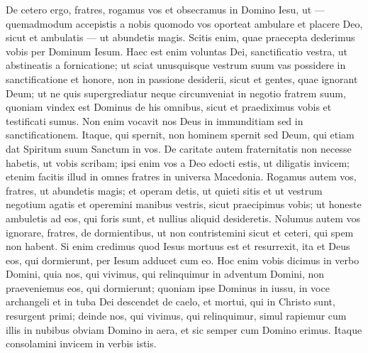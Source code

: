 \begin{biblechapter}
\begin{biblechapter}
\begin{biblechapter}
\begin{biblechapter}
\verse De cetero ergo, fratres, rogamus vos et obsecramus in Domino Iesu, ut — quemadmodum accepistis a nobis quomodo vos oporteat ambulare et placere Deo, sicut et ambulatis — ut abundetis magis. 
\verse Scitis enim, quae praecepta dederimus vobis per Dominum Iesum. 
\verse Haec est enim voluntas Dei, sanctificatio vestra, 
\verse ut abstineatis a fornicatione; ut sciat unusquisque vestrum suum vas possidere in sanctificatione et honore, 
\verse non in passione desiderii, sicut et gentes, quae ignorant Deum; 
\verse ut ne quis supergrediatur neque circumveniat in negotio fratrem suum, quoniam vindex est Dominus de his omnibus, sicut et praediximus vobis et testificati sumus. 
\verse Non enim vocavit nos Deus in immunditiam sed in sanctificationem.
 \verse Itaque, qui spernit, non hominem spernit sed Deum, qui etiam dat Spiritum suum Sanctum in vos.
 \verse De caritate autem fraternitatis non necesse habetis, ut vobis scribam; ipsi enim vos a Deo edocti estis, ut diligatis invicem; 
\verse etenim facitis illud in omnes fratres in universa Macedonia. Rogamus autem vos, fratres, ut abundetis magis; 
\verse et operam detis, ut quieti sitis et ut vestrum negotium agatis et operemini manibus vestris, sicut praecipimus vobis; 
\verse ut honeste ambuletis ad eos, qui foris sunt, et nullius aliquid desideretis.
 \verse Nolumus autem vos ignorare, fratres, de dormientibus, ut non contristemini sicut et ceteri, qui spem non habent. 
\verse Si enim credimus quod Iesus mortuus est et resurrexit, ita et Deus eos, qui dormierunt, per Iesum adducet cum eo. 
 \verse Hoc enim vobis dicimus in verbo Domini, quia nos, qui vivimus, qui relinquimur in adventum Domini, non praeveniemus eos, qui dormierunt; 
\verse quoniam ipse Dominus in iussu, in voce archangeli et in tuba Dei descendet de caelo, et mortui, qui in Christo sunt, resurgent primi; 
\verse deinde nos, qui vivimus, qui relinquimur, simul rapiemur cum illis in nubibus obviam Domino in aera, et sic semper cum Domino erimus. 
\verse Itaque consolamini invicem in verbis istis.
 

\end{biblechapter}
\end{biblechapter}
\end{biblechapter}
\end{biblechapter}
